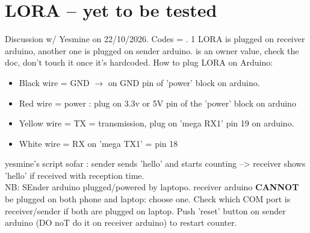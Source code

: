 \documentclass[a4paper,11pt]{article}
\newcommand{\code}[1]{\texttt{\detokenize{#1}}}
\begin{document}
\section{LORA -- yet to be tested}

Discussion w/ Yesmine on 22/10/2026. Codes  = \code{main.ccp}. 1 LORA is plugged on receiver arduino, another one is plugged on sender arduino. \code{LORA_FREQ} is an owner value, check the doc, don't touch it once it's hardcoded. How to plug LORA on Arduino:
\begin{itemize}
    \item Black wire = GND $\to $ on GND pin of 'power' block on arduino. 
    \item Red wire = power : plug on 3.3v or 5V pin of the 'power' block on arduino
    \item Yellow wire = TX = transmission, plug on 'mega RX1' pin 19 on arduino.
    \item White wire = RX on 'mega TX1' = pin 18
\end{itemize}

yesmine's script sofar : sender sends 'hello' and starts counting --> receiver shows 'hello' if received with reception time. \\

NB: SEnder arduino plugged/powered by laptopo. receiver arduino \textbf{CANNOT} be plugged on both phone and laptop: choose one. Check which COM port is receiver/sender if both are plugged on laptop. Push 'reset' button on sender arduino (DO noT do it on receiver arduino) to restart counter.
\end{document}
